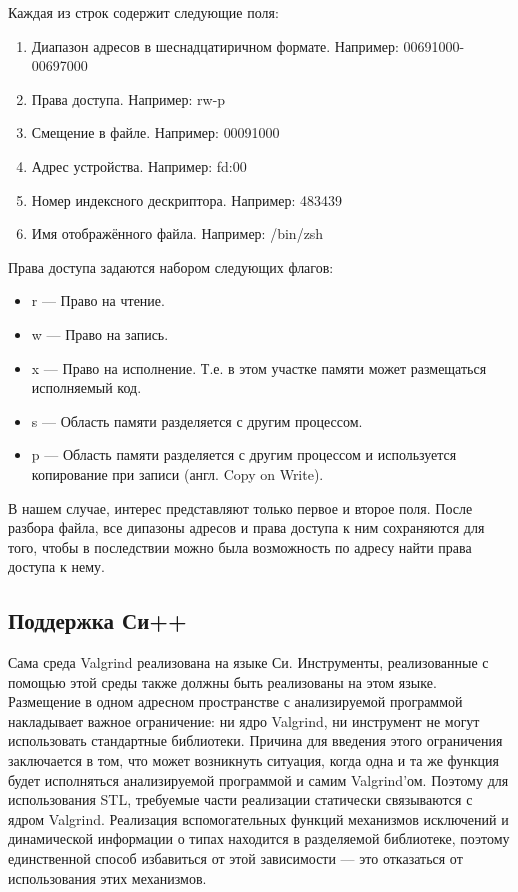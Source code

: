 \documentclass[a4paper,12pt,russian]{article}
\newcommand{\code}[1]{\textsf{#1}}
\begin{document}
Каждая из строк содержит следующие поля:
\begin{enumerate}
    \item Диапазон адресов в шеснадцатиричном формате. Например: \code{00691000-00697000}
    \item Права доступа. Например: \code{rw-p}
    \item Смещение в файле. Например: \code{00091000}
    \item Адрес устройства. Например: \code{fd:00}
    \item Номер индексного дескриптора. Например: \code{483439}
    \item Имя отображённого файла. Например: \code{/bin/zsh}
\end{enumerate}

Права доступа задаются набором следующих флагов:
\begin{itemize}
    \item \code{r} --- Право на чтение.
    \item \code{w} --- Право на запись.
    \item \code{x} --- Право на исполнение. Т.е. в этом участке памяти может размещаться исполняемый код.
    \item \code{s} --- Область памяти разделяется с другим процессом.
    \item \code{p} --- Область памяти разделяется с другим процессом и используется копирование при записи (англ. Copy on Write).
\end{itemize}

В нашем случае, интерес представляют только первое и второе поля.
После разбора файла, все дипазоны адресов и права доступа к ним сохраняются для того, чтобы в последствии можно была возможность по адресу найти права доступа к нему.

\subsection{Поддержка Си++}
Сама среда \code{Valgrind} реализована на языке Си. Инструменты, реализованные с помощью этой среды также должны быть реализованы на этом языке.
Размещение в одном адресном пространстве с анализируемой программой накладывает важное ограничение: ни ядро \code{Valgrind}, ни инструмент не могут использовать стандартные библиотеки.
Причина для введения этого ограничения заключается в том, что может возникнуть ситуация, когда одна и та же функция будет исполняться анализируемой программой и самим \code{Valgrind}'ом.
Поэтому для использования \code{STL}, требуемые части реализации статически связываются с ядром \code{Valgrind}.
Реализация вспомогательных функций механизмов исключений и динамической информации о типах находится в разделяемой библиотеке, поэтому единственной способ избавиться от этой зависимости --- это отказаться от использования этих механизмов.
\end{document}
